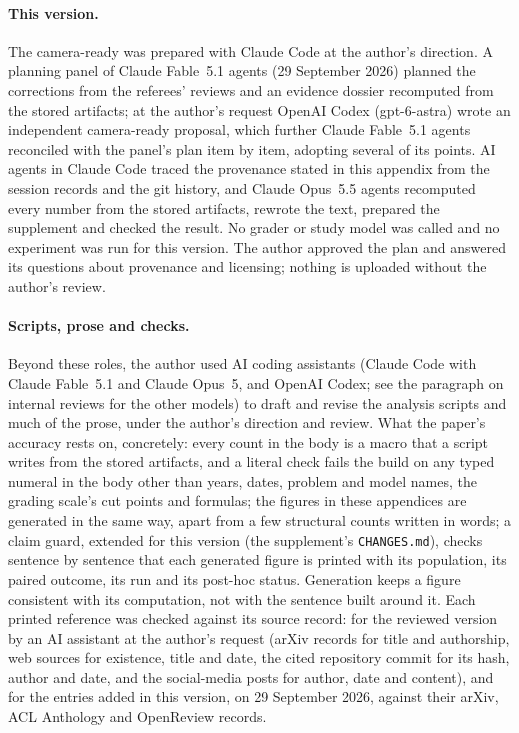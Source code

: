 \paragraph{This version.} The camera-ready was prepared with Claude Code at the author's direction. A planning panel of Claude Fable~5.1 agents (29 September 2026) planned the corrections from the referees' reviews and an evidence dossier recomputed from the stored artifacts; at the author's request OpenAI Codex (gpt-6-astra) wrote an independent camera-ready proposal, which further Claude Fable~5.1 agents reconciled with the panel's plan item by item, adopting several of its points. AI agents in Claude Code traced the provenance stated in this appendix from the session records and the git history, and Claude Opus~5.5 agents recomputed every number from the stored artifacts, rewrote the text, prepared the supplement and checked the result. No grader or study model was called and no experiment was run for this version. The author approved the plan and answered its questions about provenance and licensing; nothing is uploaded without the author's review.

\paragraph{Scripts, prose and checks.} Beyond these roles, the author used AI coding assistants (Claude Code with Claude Fable~5.1 and Claude Opus~5, and OpenAI Codex; see the paragraph on internal reviews for the other models) to draft and revise the analysis scripts and much of the prose, under the author's direction and review. What the paper's accuracy rests on, concretely: every count in the body is a macro that a script writes from the stored artifacts, and a literal check fails the build on any typed numeral in the body other than years, dates, problem and model names, the grading scale's cut points and formulas; the figures in these appendices are generated in the same way, apart from a few structural counts written in words; a claim guard, extended for this version (the supplement's \texttt{CHANGES.md}), checks sentence by sentence that each generated figure is printed with its population, its paired outcome, its run and its post-hoc status. Generation keeps a figure consistent with its computation, not with the sentence built around it. Each printed reference was checked against its source record: for the reviewed version by an AI assistant at the author's request (arXiv records for title and authorship, web sources for existence, title and date, the cited repository commit for its hash, author and date, and the social-media posts for author, date and content), and for the entries added in this version, on 29 September 2026, against their arXiv, ACL Anthology and OpenReview records.

